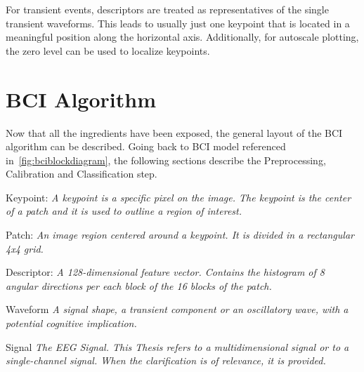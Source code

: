 For transient events, descriptors are treated as representatives of the single transient waveforms.  This leads to usually just one keypoint that is located in a meaningful position along the horizontal axis.  Additionally, for autoscale plotting, the zero level can be used to localize keypoints.

\section{BCI Algorithm}

Now that all the ingredients have been exposed, the general layout of the BCI algorithm can be described.  Going back to BCI model referenced in~\ref{fig:bciblockdiagram}, the following sections describe the Preprocessing, Calibration and Classification step.

\begin{story}
\theoremstyle{definition}

\begin{definition}{Keypoint:}
\label{def:Keypoint}
\textit{A keypoint is a specific pixel on the image.  The keypoint is the center of a patch and it is used to outline a region of interest.}
\end{definition}

\begin{definition}{Patch:}
\label{def:Patch}
\textit{An image region centered around a keypoint.  It is divided in a rectangular 4x4 grid.}
\end{definition}

\begin{definition}{Descriptor:}
\label{def:Descriptor}
\textit{A 128-dimensional \textit{feature} vector.  Contains the histogram of 8 angular directions per each block of the 16 blocks of the patch.}
\end{definition}

\begin{definition}{Waveform}
\label{def:Waveform}
\textit{A signal shape, a transient component or an oscillatory wave, with a potential cognitive implication.}
\end{definition}

\begin{definition}{Signal}
\label{def:Signal}
\textit{The EEG Signal. This Thesis refers to a multidimensional signal or to a single-channel signal. When the clarification is of relevance, it is provided.}
\end{definition}


\end{story}
